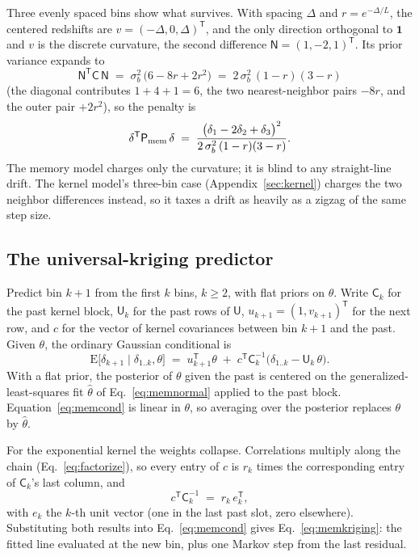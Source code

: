 \documentclass[11pt]{article}
\newcommand{\ones}{\mathbf{1}} %
\newcommand{\Cov}{\mathsf{C}}
\newcommand{\Prec}{\mathsf{P}}
\newcommand{\T}{^{\mathsf{T}}}
\begin{document}
Three evenly spaced bins show what survives.  With spacing $\Delta$
and $r = e^{-\Delta/L}$, the centered redshifts are
$v = (-\Delta, 0, \Delta)\T$, and the only direction orthogonal to
$\ones$ and $v$ is the discrete curvature, the second difference
$\mathsf{N} = (1, -2, 1)\T$.  Its prior variance expands to
\begin{equation}
  \mathsf{N}\T \Cov\, \mathsf{N}
  \;=\;
  \sigma_b^2\,\bigl(6 - 8r + 2r^2\bigr)
  \;=\;
  2\,\sigma_b^2\,(1 - r)(3 - r)
  \label{eq:memcurvvar}
\end{equation}
(the diagonal contributes $1 + 4 + 1 = 6$, the two nearest-neighbor
pairs $-8r$, and the outer pair $+2r^2$), so the penalty is
\begin{equation}
  \delta\T \Prec_{\rm mem}\,\delta
  \;=\;
  \frac{\bigl(\delta_1 - 2\delta_2 + \delta_3\bigr)^2}
       {2\,\sigma_b^2\,(1 - r)(3 - r)} .
  \label{eq:memcurv}
\end{equation}
The memory model charges only the curvature; it is blind to any
straight-line drift.  The kernel model's three-bin case
(Appendix~\ref{sec:kernel}) charges the two neighbor differences
instead, so it taxes a drift as heavily as a zigzag of the same
step size.

\subsection{The universal-kriging predictor}

Predict bin $k+1$ from the first $k$ bins, $k \geq 2$, with flat
priors on $\theta$.  Write $\Cov_k$ for the past kernel block,
$\mathsf{U}_k$ for the past rows of $\mathsf{U}$,
$u_{k+1} = (1, v_{k+1})\T$ for the next row, and $c$ for the vector
of kernel covariances between bin $k+1$ and the past.  Given
$\theta$, the ordinary Gaussian conditional is
\begin{equation}
  \mathrm{E}\bigl[\delta_{k+1} \mid \delta_{1..k}, \theta\bigr]
  \;=\;
  u_{k+1}\T\theta
  \;+\;
  c\T \Cov_k^{-1}
  \bigl(\delta_{1..k} - \mathsf{U}_k\,\theta\bigr).
  \label{eq:memcond}
\end{equation}
With a flat prior, the posterior of $\theta$ given the past is
centered on the generalized-least-squares fit $\hat{\theta}$ of
Eq.~\eqref{eq:memnormal} applied to the past block.
Equation~\eqref{eq:memcond} is linear in $\theta$, so averaging over
the posterior replaces $\theta$ by $\hat{\theta}$.

For the exponential kernel the weights collapse.  Correlations
multiply along the chain (Eq.~\eqref{eq:factorize}), so every entry
of $c$ is $r_k$ times the corresponding entry of $\Cov_k$'s last
column, and
\begin{equation}
  c\T \Cov_k^{-1} \;=\; r_k\, e_k\T ,
  \label{eq:memlastcol}
\end{equation}
with $e_k$ the $k$-th unit vector (one in the last past slot, zero
elsewhere).  Substituting both results into Eq.~\eqref{eq:memcond}
gives Eq.~\eqref{eq:memkriging}: the fitted line evaluated at the
new bin, plus one Markov step from the last residual.
\end{document}
